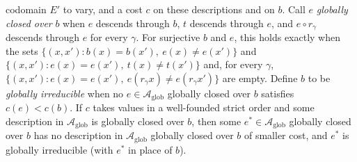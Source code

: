 \begin{theorem}
codomain \(E'\) to vary, and a cost \(c\) on these descriptions and on \(b\).
Call \(e\) \emph{globally closed over} \(b\) when \(e\) descends through \(b\),
\(t\) descends through \(e\), and \(e\circ r_\gamma\) descends through \(e\) for
every \(\gamma\). For surjective \(b\) and \(e\), this holds exactly when the sets
\(\{(x,x'):b(x)=b(x'),\ e(x)\ne e(x')\}\) and
\(\{(x,x'):e(x)=e(x'),\ t(x)\ne t(x')\}\) and, for every \(\gamma\),
\(\{(x,x'):e(x)=e(x'),\ e(r_\gamma x)\ne e(r_\gamma x')\}\) are empty. Define
\(b\) to be \emph{globally irreducible} when no \(e\in\mathcal A_{\mathrm{glob}}\)
globally closed over \(b\) satisfies \(c(e)<c(b)\). If \(c\) takes values in a
well-founded strict order and some description in \(\mathcal A_{\mathrm{glob}}\)
is globally closed over \(b\), then some \(e^\ast\in\mathcal A_{\mathrm{glob}}\)
globally closed over \(b\) has no description in \(\mathcal A_{\mathrm{glob}}\)
globally closed over \(b\) of smaller cost, and \(e^\ast\) is globally
irreducible (with \(e^\ast\) in place of \(b\)).
\end{theorem}

